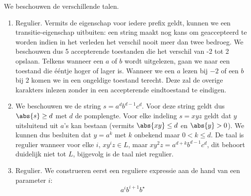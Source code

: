 \documentclass{article}
\begin{document}
\begin{answer}
We beschouwen de verschillende talen.
\begin{enumerate}
 \item Regulier. Vermits de eigenschap voor iedere prefix geldt, kunnen we een transitie-eigenschap uitbuiten: een string maakt nog kans om geaccepteerd te worden indien in het verleden het verschil nooit meer dan twee bedroeg. We beschouwen dus 5 accepterende toestanden die het verschil van -2 tot 2 opslaan. Telkens wanneer een $a$ of $b$ wordt uitgelezen, gaan we naar een toestand die \'e\'entje hoger of lager is. Wanneer we een $a$ lezen bij $-2$ of een $b$ bij $2$ komen we in een ongeldige toestand terecht. Deze zal de overige karakters inlezen zonder in een accepterende eindtoestand te eindigen.\\
 \begin{center}
 \end{center}
 \item We beschouwen we de string $s=a^db^{d-1}c^d$. Voor deze string geldt dus $\abs{s}\geq d$ met $d$ de pomplengte. Voor elke indeling $s=xyz$ geldt dat $y$ uitsluitend uit $a$'s kan bestaan (vermits $\abs{xy}\leq d$ en $\abs{y}>0$). We kunnen dus besluiten dat $y=a^k$ met $k$ onbekend maar $0<k\leq d$. De taal is regulier wanneer voor elke $i$, $xy^iz\in L$, maar $xy^2z=a^{d+k}b^{d-1}c^d$, dit behoort duidelijk niet tot $L$, bijgevolg is de taal niet regulier.
 \item Regulier. We construeren eerst een reguliere expressie aan de hand van een parameter $i$:
 \begin{equation}
  a^ib^{i+1}b^\star

\end{equation}
\end{enumerate}
\end{answer}
\end{document}
